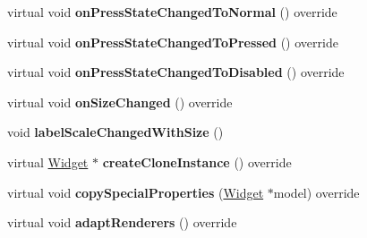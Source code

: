 \begin{DoxyCompactItemize}
virtual void {\bfseries on\+Press\+State\+Changed\+To\+Normal} () override
\item 
\mbox{\label{classui_1_1Text_a2ebc0108c0daace8dda1b9130311fd26}} 
virtual void {\bfseries on\+Press\+State\+Changed\+To\+Pressed} () override
\item 
\mbox{\label{classui_1_1Text_a7c3775fbea212723459a9fce835688c2}} 
virtual void {\bfseries on\+Press\+State\+Changed\+To\+Disabled} () override
\item 
\mbox{\label{classui_1_1Text_af953fe46491c19625b2027c691f6b9d2}} 
virtual void {\bfseries on\+Size\+Changed} () override
\item 
\mbox{\label{classui_1_1Text_a319195ce447457678a0dc84ad0462ce4}} 
void {\bfseries label\+Scale\+Changed\+With\+Size} ()
\item 
\mbox{\label{classui_1_1Text_aefaf2032fe660d3e19d77682ac8992fe}} 
virtual \hyperlink{classui_1_1Widget}{Widget} $\ast$ {\bfseries create\+Clone\+Instance} () override
\item 
\mbox{\label{classui_1_1Text_a90a50c1e89198edaae588a4dc54cf426}} 
virtual void {\bfseries copy\+Special\+Properties} (\hyperlink{classui_1_1Widget}{Widget} $\ast$model) override
\item 
\mbox{\label{classui_1_1Text_ae85df45d42314b3bd8e5616d430e0f15}} 
virtual void {\bfseries adapt\+Renderers} () override
\end{DoxyCompactItemize}
